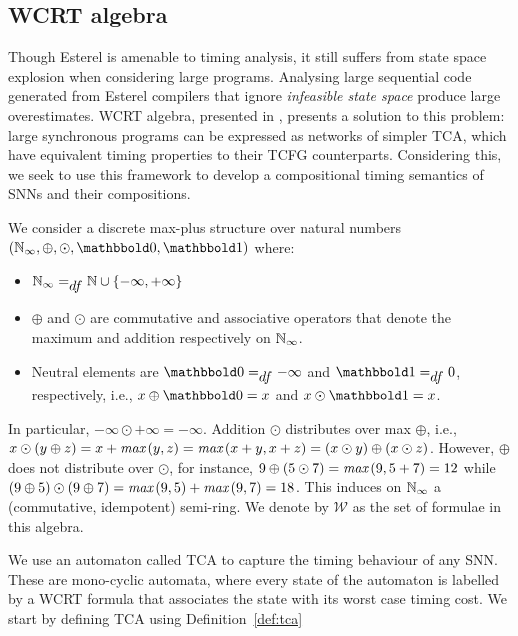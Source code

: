 \subsection{\ac{WCRT} algebra}
\label{sec:wcrt-algebra}

Though Esterel is amenable to timing analysis, it still suffers from state space explosion when considering large programs. 
Analysing large sequential code generated from Esterel compilers that ignore \emph{infeasible state space} 
produce large overestimates. \ac{WCRT} algebra, presented in \cite{wang2017timing}, presents a solution to this problem: large synchronous programs can be expressed as 
networks of simpler \ac{TCA}, which have equivalent timing properties to their \ac{TCFG} counterparts. Considering this, we
seek to use this framework to develop a compositional timing semantics of \acp{SNN} and their compositions.

We consider a discrete max-plus structure over
natural numbers $(\Nat_{\infty}, \oplus, \odot, \zero, \one)$ where:
\begin{itemize}
	\item ${\mathbb N}_{\infty} =_{\textstyle{df}} {\mathbb N} \cup \{ -\infty, +\infty \}$
	\item  $\oplus$ and $\odot$ are commutative and associative operators that 
	denote the maximum and addition respectively on ${\mathbb N}_{\infty}$. 
	\item Neutral elements are $\zero \dfs -\infty$ and $\one \dfs 0$,
	respectively, i.e., $x \oplus \zero = x$ and $x \odot \one = x$. 
\end{itemize}

In particular, $-\infty \odot +\infty = -\infty$. Addition
$\odot$ distributes over max $\oplus$, i.e.,
$x \odot \left(y \oplus z\right) = x + \textit{max}\left(y, z\right) = \textit{max}\left(x + y, x + z\right) =
\left(x \odot y\right) \oplus \left(x \odot z\right)$. However, $\oplus$ does not distribute
over $\odot$, for instance, $9 \oplus \left(5 \odot 7\right) = \textit{max}\left(9, 5 + 7\right) = 12$
while $\left(9 \oplus 5\right) \odot \left(9 \oplus 7\right) = \textit{max}\left(9, 5\right) + \textit{max}\left(9, 7\right) = 18$.
This induces on ${\mathbb N}_{\infty}$ a (commutative, idempotent) semi-ring.
We denote by $\mathcal{W}$ as the set of formulae in this algebra.

We use an automaton called \ac{TCA} to capture the timing behaviour of any \ac{SNN}.
These are mono-cyclic automata, where every state of the automaton is labelled by a
WCRT formula that associates the state with its worst case timing cost.
We start by defining \ac{TCA} using Definition~\ref{def:tca}


